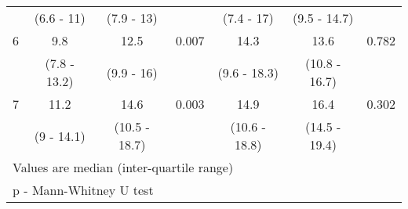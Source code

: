 \begin{table}[h]
\begin{tabular}{| c | c c c | c c c |}
		           & (6.6 - 11)    & (7.9 - 13)    &              & (7.4 - 17)    & (9.5 - 14.7)  &  \\
		6          & 9.8           & 12.5          & 0.007        & 14.3          & 13.6          & 0.782        \\
		           & (7.8 - 13.2)  & (9.9 - 16)    &              & (9.6 - 18.3)  & (10.8 - 16.7) &  \\
		7          & 11.2          & 14.6          & 0.003        & 14.9          & 16.4          & 0.302        \\
		           & (9 - 14.1)    & (10.5 - 18.7) &              & (10.6 - 18.8) & (14.5 - 19.4) &  \\ \hline
		\multicolumn{7}{l}{Values are median (inter-quartile range)}                                            \\
		\multicolumn{7}{l}{p - Mann-Whitney U test}
	\end{tabular}
\end{table}
